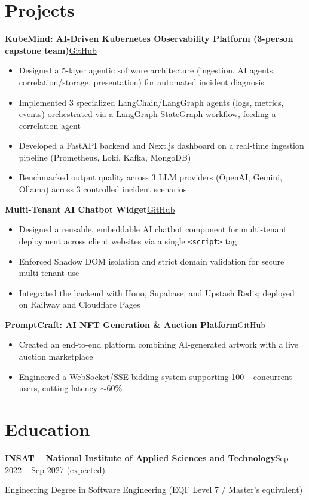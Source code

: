 \documentclass[10pt,a4paper]{article}
\newcommand{\entry}[2]{\vspace{1pt}\noindent\textbf{#1}\hfill{\color{muted}#2}\par}
\newcommand{\gh}[1]{\href{https://github.com/Hsan003/#1}{GitHub}}
\begin{document}
\section{Projects}
\entry{KubeMind: AI-Driven Kubernetes Observability Platform (3-person capstone team)}{\gh{kubemind}}
\begin{itemize}
  \item Designed a 5-layer agentic software architecture (ingestion, AI agents, correlation/storage, presentation) for automated incident diagnosis
  \item Implemented 3 specialized LangChain/LangGraph agents (logs, metrics, events) orchestrated via a LangGraph StateGraph workflow, feeding a correlation agent
  \item Developed a FastAPI backend and Next.js dashboard on a real-time ingestion pipeline (Prometheus, Loki, Kafka, MongoDB)
  \item Benchmarked output quality across 3 LLM providers (OpenAI, Gemini, Ollama) across 3 controlled incident scenarios
\end{itemize}
\entry{Multi-Tenant AI Chatbot Widget}{\gh{AI-Assistant-Backend}}
\begin{itemize}
  \item Designed a reusable, embeddable AI chatbot component for multi-tenant deployment across client websites via a single \texttt{<script>} tag
  \item Enforced Shadow DOM isolation and strict domain validation for secure multi-tenant use
  \item Integrated the backend with Hono, Supabase, and Upstash Redis; deployed on Railway and Cloudflare Pages
\end{itemize}
\entry{PromptCraft: AI NFT Generation \& Auction Platform}{\gh{prompt-craft-back}}
\begin{itemize}
  \item Created an end-to-end platform combining AI-generated artwork with a live auction marketplace
  \item Engineered a WebSocket/SSE bidding system supporting 100+ concurrent users, cutting latency $\sim$60\%
\end{itemize}

\section{Education}
\entry{INSAT -- National Institute of Applied Sciences and Technology}{Sep 2022 -- Sep 2027 (expected)}
Engineering Degree in Software Engineering (EQF Level 7 / Master's equivalent)
\end{document}
